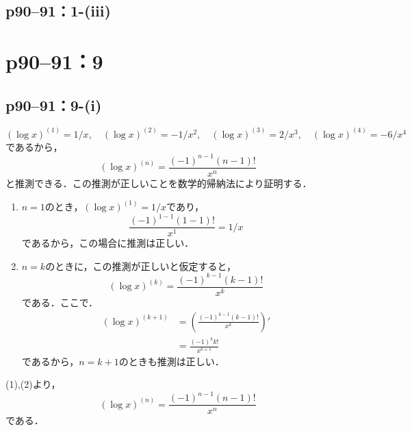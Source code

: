 \documentclass[a4paper,10pt,fleqn]{ltjsarticle}
\begin{document}
\subsection*{p90--91：1-(iii)}





\section*{p90--91：9}

\subsection*{p90--91：9-(i)}

\begin{tleftbar}
    \[
        ( \log x )^{(1)}= 1/x , \quad (\log x)^{(2)} = - 1/x^2 , \quad (\log x)^{(3)} = 2/x^3,\quad (\log x)^{(4)} = - 6 /x^4
    \]
    であるから，
    \[
        (\log x)^{(n)} = \frac{(-1)^{n-1}  (n-1)!}{x^n}
    \]
    と推測できる．この推測が正しいことを数学的帰納法により証明する．
    \begin{enumerate}
        \item $n=1$のとき，$(\log x)^{(1)} = 1/x$であり，
              \[
                  \frac{(-1)^{1-1}  (1-1)!}{x^1}=1/x
              \]
              であるから，この場合に推測は正しい．
        \item $n=k$のときに，この推測が正しいと仮定すると，
              \[
                  (\log x)^{(k)} = \frac{(-1)^{k-1}  (k-1)!}{x^k}
              \]
              である．ここで．
              \begin{align*}
                  (\log x)^{(k+1)} & = \left (\frac{(-1)^{k-1}  (k-1)!}{x^k} \right ) ' \\
                                   & = \frac{(-1)^k  k!}{x^{k+1}}
              \end{align*}
              であるから，$n=k+1$のときも推測は正しい．
    \end{enumerate}
    (1),(2)より，
    \[
        (\log x)^{(n)} = \frac{(-1)^{n-1}  (n-1)!}{x^n}
    \]
    である．
\end{tleftbar}
\end{document}
